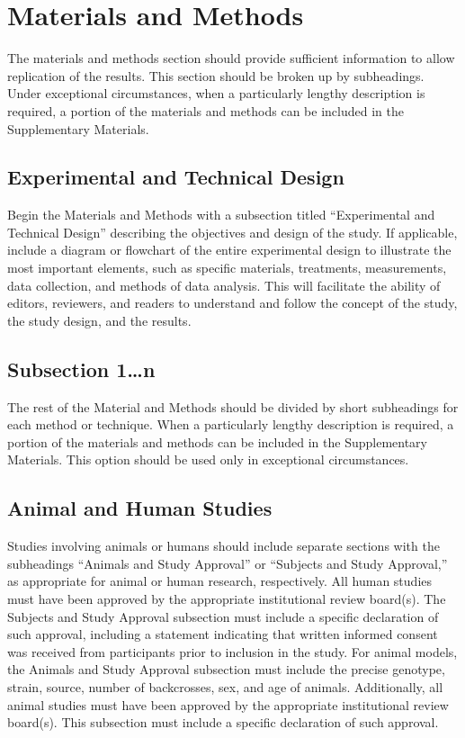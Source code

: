 \documentclass{article}
\begin{document}
\section{Materials and Methods}
The materials and methods section should provide sufficient information to allow replication of the results. This section should be broken up by subheadings. Under exceptional circumstances, when a particularly lengthy description is required, a portion of the materials and methods can be included in the Supplementary Materials. 

\subsection{Experimental and Technical Design}
Begin the Materials and Methods with a subsection titled “Experimental and Technical Design” describing the objectives and design of the study.  If applicable, include a diagram or flowchart of the entire experimental design to illustrate the most important elements, such as specific materials, treatments, measurements, data collection, and methods of data analysis. This will facilitate the ability of editors, reviewers, and readers to understand and follow the concept of the study, the study design, and the results. 

\subsection{Subsection 1…n}
The rest of the Material and Methods should be divided by short subheadings for each method or technique. When a particularly lengthy description is required, a portion of the materials and methods can be included in the Supplementary Materials. This option should be used only in exceptional circumstances.

\subsection{Animal and Human Studies}
Studies involving animals or humans should include separate sections with the subheadings “Animals and Study Approval” or “Subjects and Study Approval,” as appropriate for animal or human research, respectively. All human studies must have been approved by the appropriate institutional review board(s). The Subjects and Study Approval subsection must include a specific declaration of such approval, including a statement indicating that written informed consent was received from participants prior to inclusion in the study. For animal models, the Animals and Study Approval subsection must include the precise genotype, strain, source, number of backcrosses, sex, and age of animals. Additionally, all animal studies must have been approved by the appropriate institutional review board(s). This subsection must include a specific declaration of such approval.
\end{document}

